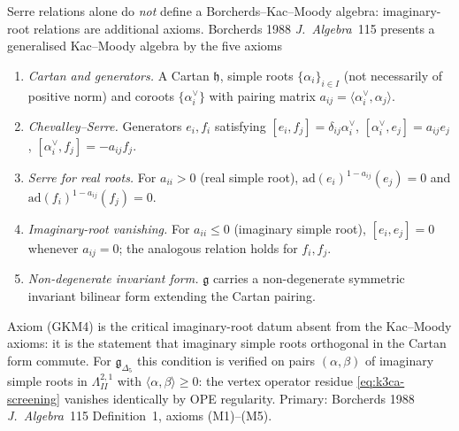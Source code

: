 \begin{remark}
\label{rem:k3ca-borcherds-5-axioms}
Serre relations alone do \emph{not} define a Borcherds--Kac--Moody
algebra: imaginary-root relations are additional axioms. Borcherds
1988 \emph{J.\ Algebra}~115 presents a generalised Kac--Moody
algebra by the five axioms
\begin{enumerate}[label=\textup{(GKM\arabic*)}]
\item \emph{Cartan and generators.} A Cartan $\mathfrak h$, simple
 roots $\{\alpha_i\}_{i\in I}$ (not necessarily of positive norm)
 and coroots $\{\alpha_i^\vee\}$ with pairing matrix
 $a_{ij} = \langle\alpha_i^\vee,\alpha_j\rangle$.
\item \emph{Chevalley--Serre.} Generators $e_i,f_i$ satisfying
 $[e_i,f_j] = \delta_{ij}\alpha_i^\vee$,
 $[\alpha_i^\vee,e_j] = a_{ij}e_j$,
 $[\alpha_i^\vee,f_j] = -a_{ij}f_j$.
\item \emph{Serre for real roots.} For $a_{ii} > 0$ (real simple
 root), $\mathrm{ad}(e_i)^{1-a_{ij}}(e_j) = 0$ and
 $\mathrm{ad}(f_i)^{1-a_{ij}}(f_j) = 0$.
\item \emph{Imaginary-root vanishing.} For $a_{ii}\leq 0$ (imaginary
 simple root), $[e_i,e_j] = 0$ whenever $a_{ij} = 0$; the analogous
 relation holds for $f_i,f_j$.
\item \emph{Non-degenerate invariant form.} $\mathfrak g$ carries a
 non-degenerate symmetric invariant bilinear form extending the
 Cartan pairing.
\end{enumerate}
Axiom (GKM4) is the critical imaginary-root datum absent from the
Kac--Moody axioms: it is the statement that imaginary simple roots
orthogonal in the Cartan form commute. For $\mathfrak g_{\Delta_5}$
this condition is verified on pairs $(\alpha,\beta)$ of imaginary
simple roots in $\Lambda^{2,1}_{II}$ with
$\langle\alpha,\beta\rangle\geq 0$: the vertex operator residue
\eqref{eq:k3ca-screening} vanishes identically by OPE regularity.
Primary: Borcherds 1988 \emph{J.\ Algebra}~115 Definition~1, axioms
(M1)--(M5).
\end{remark}

